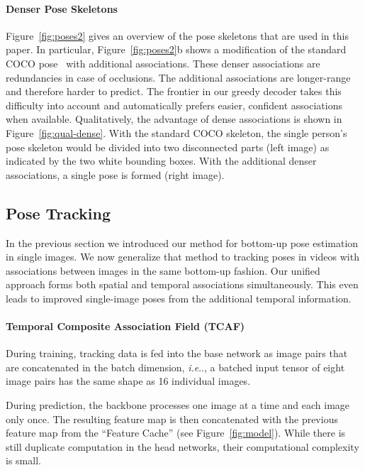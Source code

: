 \documentclass[journal]{IEEEtran}
\makeatletter
\DeclareRobustCommand\onedot{\futurelet\@let@token\@onedot}
\def\@onedot{\ifx\@let@token.\else.\null\fi\xspace}
\def\ie{\emph{i.e}\onedot} \def\Ie{\emph{I.e}\onedot}
\makeatother
\begin{document}
\paragraph{Denser Pose Skeletons}

Figure~\ref{fig:poses2} gives an overview of the pose skeletons that are used
in this paper.
In particular, Figure~\ref{fig:poses2}b shows a modification of the standard COCO
pose~\cite{lin2014microsoft} with additional associations. These denser associations
are redundancies
in case of occlusions.
The additional associations are longer-range and therefore harder to predict.
The frontier in our greedy decoder takes
this difficulty into account and automatically prefers easier, confident
associations when available.
Qualitatively, the advantage of dense associations is shown in
Figure~\ref{fig:qual-dense}. With the standard COCO skeleton, the single
person's pose skeleton would be divided into two disconnected parts (left image)
as indicated by the two white bounding boxes.
With the additional denser associations, a single pose is formed (right image).



\subsection{Pose Tracking}
\label{sec:pose-tracking}

In the previous section we introduced our method for bottom-up pose estimation
in single images.
We now
generalize that method to tracking poses in videos with associations between images in the
same bottom-up fashion. Our unified approach forms both spatial and
temporal associations simultaneously. This even leads to improved single-image
poses from the additional temporal information.



\paragraph{Temporal Composite Association Field (TCAF)}

During training, tracking data is fed into the base network as image pairs
that are concatenated
in the batch dimension, \ie, a batched input tensor of eight image pairs has
the same shape as 16 individual images.

During prediction, the backbone processes one image at a time and each image only once.
The resulting feature map is
then concatenated with the previous feature map from the ``Feature Cache''
(see Figure~\ref{fig:model}).
While there is still duplicate computation in the head networks, their
computational complexity is small.
\end{document}

